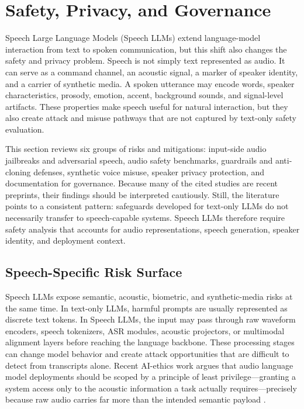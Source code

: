 \section{Safety, Privacy, and Governance}
\label{sec:safety_privacy_governance}

Speech Large Language Models (Speech LLMs) extend language-model interaction from text to spoken communication, but this shift also changes the safety and privacy problem. Speech is not simply text represented as audio. It can serve as a command channel, an acoustic signal, a marker of speaker identity, and a carrier of synthetic media. A spoken utterance may encode words, speaker characteristics, prosody, emotion, accent, background sounds, and signal-level artifacts. These properties make speech useful for natural interaction, but they also create attack and misuse pathways that are not captured by text-only safety evaluation.

This section reviews six groups of risks and mitigations: input-side audio jailbreaks and adversarial speech, audio safety benchmarks, guardrails and anti-cloning defenses, synthetic voice misuse, speaker privacy protection, and documentation for governance. Because many of the cited studies are recent preprints, their findings should be interpreted cautiously. Still, the literature points to a consistent pattern: safeguards developed for text-only LLMs do not necessarily transfer to speech-capable systems. Speech LLMs therefore require safety analysis that accounts for audio representations, speech generation, speaker identity, and deployment context.

\subsection{Speech-Specific Risk Surface}

Speech LLMs expose semantic, acoustic, biometric, and synthetic-media risks at the same time. In text-only LLMs, harmful prompts are usually represented as discrete text tokens. In Speech LLMs, the input may pass through raw waveform encoders, speech tokenizers, ASR modules, acoustic projectors, or multimodal alignment layers before reaching the language backbone. These processing stages can change model behavior and create attack opportunities that are difficult to detect from transcripts alone. Recent AI-ethics work argues that audio language model deployments should be scoped by a principle of least privilege---granting a system access only to the acoustic information a task actually requires---precisely because raw audio carries far more than the intended semantic payload \citep{he2025modelhears}.

